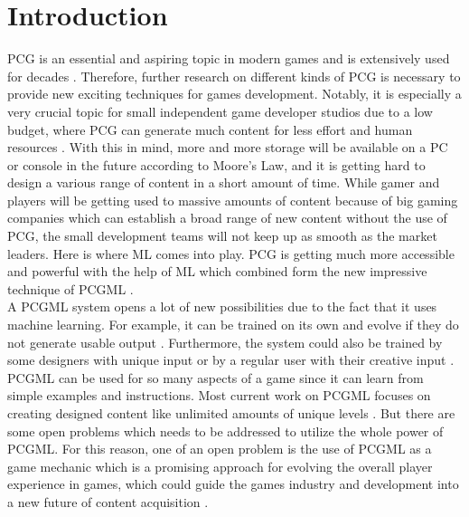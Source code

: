 \documentclass[MGS,Master,english]{twbook}%
\begin{document}
\chapter{Introduction}
\ac{PCG} is an essential and aspiring topic in modern games and is extensively used for decades \cite{pcg::whatIsPCG}. Therefore, further research on different kinds of \ac{PCG} is necessary to provide new exciting techniques for games development. Notably, it is especially a very crucial topic for small independent game developer studios due to a low budget, where \ac{PCG} can generate much content for less effort and human resources \cite{pcg::shortHistoryOfDynamicAndPCG}. With this in mind, more and more storage will be available on a \ac{PC} or console in the future according to Moore's Law, and it is getting hard to design a various range of content in a short amount of time. While gamer and players will be getting used to massive amounts of content because of big gaming companies which can establish a broad range of new content without the use of PCG, the small development teams will not keep up as smooth as the market leaders. Here is where \ac{ML} comes into play. \ac{PCG} is getting much more accessible and powerful with the help of ML which combined form the new impressive technique of \ac{PCGML} \cite{pcgml::paper}.\\
A \ac{PCGML} system opens a lot of new possibilities due to the fact that it uses machine learning. For example, it can be trained on its own and evolve if they do not generate usable output \cite{pcgml::paper}. Furthermore, the system could also be trained by some designers with unique input or by a regular user with their creative input \cite{pcgml::paper}. \ac{PCGML} can be used for so many aspects of a game since it can learn from simple examples and instructions. Most current work on PCGML focuses on creating designed content like unlimited amounts of unique levels \cite{pcgml::paper}. But there are some open problems which needs to be addressed to utilize the whole power of PCGML. For this reason, one of an open problem is the use of \ac{PCGML} as a game mechanic which is a promising approach for evolving the overall player experience in games, which could guide the games industry and development into a new future of content acquisition \cite{pcgml::paper}.
\end{document}
